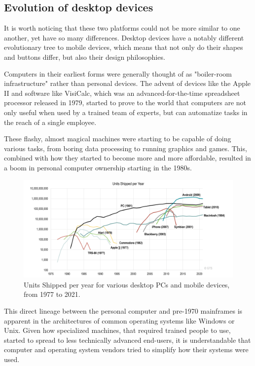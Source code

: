 \subsection{Evolution of desktop devices}

It is worth noticing that these two platforms could not be more similar to one another, yet have so many differences. Desktop devices have a notably different evolutionary tree to mobile devices, which means that not only do their shapes and buttons differ, but also their design philosophies.

Computers in their earliest forms were generally thought of as "boiler-room infrastructure" rather than personal devices. The advent of devices like the Apple II and software like VisiCalc, which was an advanced-for-the-time spreadsheet processor released in 1979, started to prove to the world that computers are not only useful when used by a trained team of experts, but can automatize tasks in the reach of a single employee. \cite{NYBirthPC}

These flashy, almost magical machines were starting to be capable of doing various tasks, from boring data processing to running graphics and games. This, combined with how they started to become more and more affordable, resulted in a boom in personal computer ownership starting in the 1980s.

\begin{figure}[htbp]
    \centering
    \includegraphics[width=\textwidth]{./figures/historical_pc_usage.png}
    \caption{Units Shipped per year for various desktop PCs and mobile devices, from 1977 to 2021. \cite{TGPCHis}}
    \label{FigHistoricalPC}
\end{figure}

This direct lineage between the personal computer and pre-1970 mainframes is apparent in the architectures of common operating systems like Windows or Unix. Given how specialized machines, that required trained people to use, started to spread to less technically advanced end-users, it is understandable that computer and operating system vendors tried to simplify how their systems were used.

